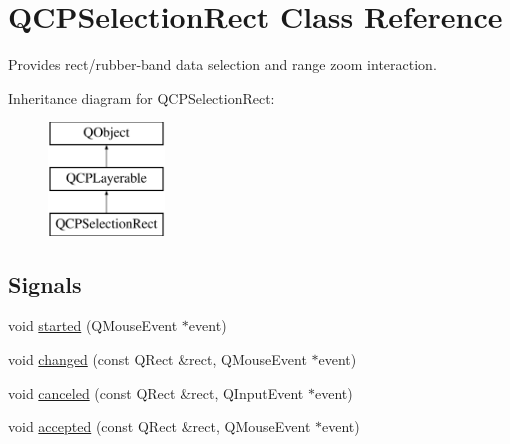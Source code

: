 \hypertarget{class_q_c_p_selection_rect}{}\section{Q\+C\+P\+Selection\+Rect Class Reference}
\label{class_q_c_p_selection_rect}


Provides rect/rubber-\/band data selection and range zoom interaction.  


Inheritance diagram for Q\+C\+P\+Selection\+Rect\+:\begin{figure}[H]
\begin{center}
\leavevmode
\includegraphics[height=3.000000cm]{class_q_c_p_selection_rect}
\end{center}
\end{figure}
\subsection*{Signals}
\begin{DoxyCompactItemize}
\item 
void \hyperlink{class_q_c_p_selection_rect_a7b7162d19f4f2174d3644ff1a5d335aa}{started} (Q\+Mouse\+Event $\ast$event)
\item 
void \hyperlink{class_q_c_p_selection_rect_a1bab11026bca52740c2e6682623e6964}{changed} (const Q\+Rect \&rect, Q\+Mouse\+Event $\ast$event)
\item 
void \hyperlink{class_q_c_p_selection_rect_aeb82009393c90130102dccf36477b906}{canceled} (const Q\+Rect \&rect, Q\+Input\+Event $\ast$event)
\item 
void \hyperlink{class_q_c_p_selection_rect_a15a43542e1f7b953a44c260b419e6d2c}{accepted} (const Q\+Rect \&rect, Q\+Mouse\+Event $\ast$event)
\end{DoxyCompactItemize}
